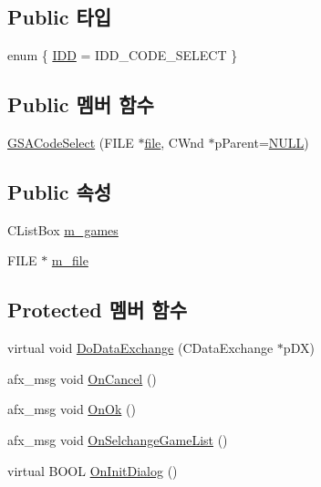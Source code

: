 \subsection*{Public 타입}
\begin{DoxyCompactItemize}
\item 
enum \{ \mbox{\hyperlink{class_g_s_a_code_select_a248fc16f816d8ee4cc8e8e16f71a0167acbcc533e23047c863f6466b3b84f499a}{I\+DD}} = I\+D\+D\+\_\+\+C\+O\+D\+E\+\_\+\+S\+E\+L\+E\+CT
 \}
\end{DoxyCompactItemize}
\subsection*{Public 멤버 함수}
\begin{DoxyCompactItemize}
\item 
\mbox{\hyperlink{class_g_s_a_code_select_abe2d23afcbf2fe70e2aaf6ced96c9b1c}{G\+S\+A\+Code\+Select}} (F\+I\+LE $\ast$\mbox{\hyperlink{expr-lex_8cpp_a702945180aa732857b380a007a7e2a21}{file}}, C\+Wnd $\ast$p\+Parent=\mbox{\hyperlink{_system_8h_a070d2ce7b6bb7e5c05602aa8c308d0c4}{N\+U\+LL}})
\end{DoxyCompactItemize}
\subsection*{Public 속성}
\begin{DoxyCompactItemize}
\item 
C\+List\+Box \mbox{\hyperlink{class_g_s_a_code_select_a732e7dca958e45d23a1d00234c23c838}{m\+\_\+games}}
\item 
F\+I\+LE $\ast$ \mbox{\hyperlink{class_g_s_a_code_select_a96b171e4976a250bdcac447654cdef12}{m\+\_\+file}}
\end{DoxyCompactItemize}
\subsection*{Protected 멤버 함수}
\begin{DoxyCompactItemize}
\item 
virtual void \mbox{\hyperlink{class_g_s_a_code_select_adae15096d0425900fee08d7bf710ac21}{Do\+Data\+Exchange}} (C\+Data\+Exchange $\ast$p\+DX)
\item 
afx\+\_\+msg void \mbox{\hyperlink{class_g_s_a_code_select_ab959eeacc114c26cdb5933e4e501164b}{On\+Cancel}} ()
\item 
afx\+\_\+msg void \mbox{\hyperlink{class_g_s_a_code_select_a8d35a28174f3e4a5b42b7906741c4a63}{On\+Ok}} ()
\item 
afx\+\_\+msg void \mbox{\hyperlink{class_g_s_a_code_select_a14529b62932e8eed3bc92f1a4d902b48}{On\+Selchange\+Game\+List}} ()
\item 
virtual B\+O\+OL \mbox{\hyperlink{class_g_s_a_code_select_a8614bcbc03f8fc22303296416f66025f}{On\+Init\+Dialog}} ()
\end{DoxyCompactItemize}


